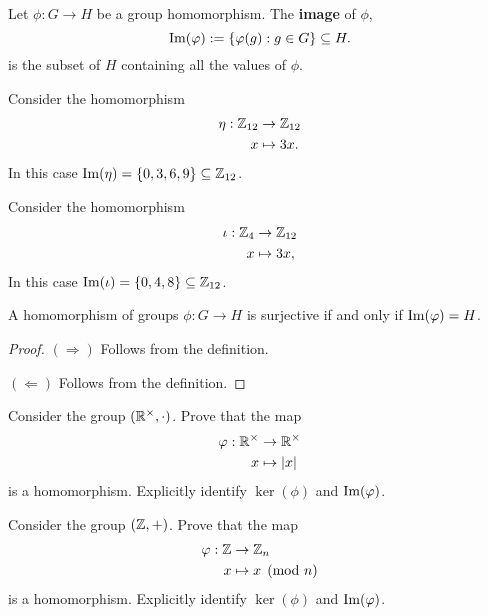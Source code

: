 \documentclass{ximera}
\begin{document}
\begin{definition}
  Let $\phi:G\to H$ be a group homomorphism. The \textbf{image} of
  $\phi$,
  \[
  \operatorname{Im}(\varphi) := \{\varphi(g): g\in G\}\subseteq H.
  \]
  is the subset of $H$ containing all the values of $\phi$.
\end{definition}

\begin{example}
  Consider the homomorphism
  \begin{align*}
    \eta:\mathbb Z_{12} &\to \mathbb Z_{12}\\
    x &\mapsto 3x.
  \end{align*}
  In this case $\operatorname{Im}(\eta) = \{0,3,6,9\}\subseteq \mathbb Z_{12}$.
\end{example}

\begin{example}\label{E:I1} 
  Consider the homomorphism
  \begin{align*}
    \iota:\mathbb Z_{4} &\to \mathbb Z_{12}\\
    x &\mapsto 3x,
  \end{align*}
  In this case $\operatorname{Im}(\iota) = \{0,4,8\}\subseteq \mathbb Z_{12}$.
\end{example}


\begin{lemma}
    A homomorphism of groups $\phi:G\to H$ is surjective if and only
    if $\operatorname{Im}(\varphi) = H$.
    \begin{proof}
      $(\Rightarrow)$ Follows from the definition.

      $(\Leftarrow)$ Follows from the definition.
    \end{proof}
\end{lemma}


\begin{exercise}
  Consider the group $(\mathbb R^\times,\cdot)$. Prove that
  the map
  \begin{align*}
    \varphi:\mathbb R^\times &\to \mathbb R^\times\\
    x &\mapsto |x|
  \end{align*}
  is a homomorphism. Explicitly identify $\ker(\phi)$ and
  $\operatorname{Im}(\varphi)$.
\end{exercise}


\begin{exercise}
  Consider the group $(\mathbb Z,+)$. Prove that
  the map
  \begin{align*}
    \varphi:\mathbb Z &\to \mathbb Z_n\\
    x &\mapsto x\pmod{n}
  \end{align*}
  is a homomorphism. Explicitly identify $\ker(\phi)$ and
  $\operatorname{Im}(\varphi)$.
\end{exercise}
\end{document}
